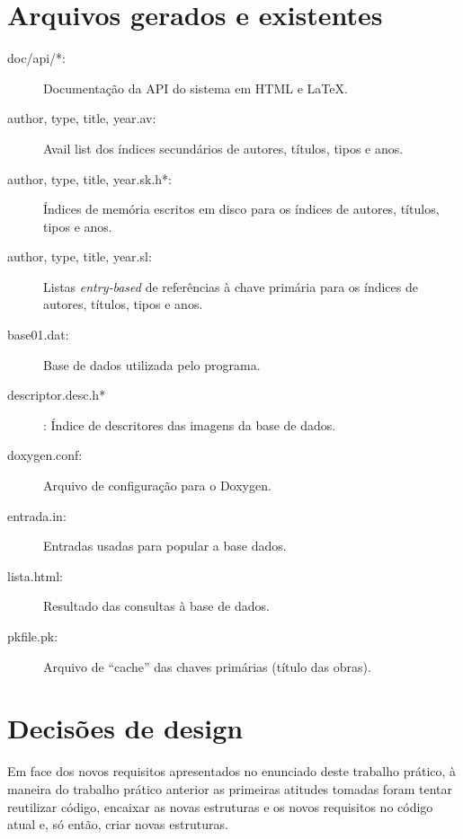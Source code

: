 \documentclass[a4paper,10pt]{article}
\begin{document}
\section{Arquivos gerados e existentes}
\begin{description}
\item[doc/api/*:] Documentação da API do sistema em HTML e LaTeX.
\item[author, type, title, year.av:] Avail list dos índices secundários de autores, títulos, tipos e anos.
\item[author, type, title, year.sk.h*:] Índices de memória escritos em disco para os índices de autores, títulos, tipos e anos.
\item[author, type, title, year.sl:] Listas \textit{entry-based} de referências à chave primária para os índices de autores, títulos, tipos e anos.
\item[base01.dat:] Base de dados utilizada pelo programa.
\item[descriptor.desc.h*]: Índice de descritores das imagens da base de dados.
\item[doxygen.conf:] Arquivo de configuração para o Doxygen.
\item[entrada.in:] Entradas usadas para popular a base dados.
\item[lista.html:] Resultado das consultas à base de dados.
\item[pkfile.pk:] Arquivo de ``cache'' das chaves primárias (título das obras).
\end{description}

\section{Decisões de design}\label{designdecisions}
Em face dos novos requisitos apresentados no enunciado deste trabalho prático, à maneira do trabalho prático anterior as primeiras atitudes tomadas foram tentar reutilizar código, encaixar as novas estruturas e os novos requisitos no código atual e, só então, criar novas estruturas.
\end{document}

